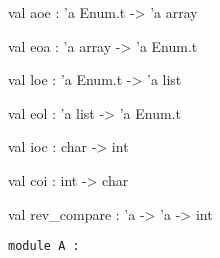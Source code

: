 \documentclass[11pt]{article}
\begin{document}
\label{val:Util.aoe}\begin{ocamldoccode}
val aoe : 'a Enum.t -> 'a array
\end{ocamldoccode}




\label{val:Util.eoa}\begin{ocamldoccode}
val eoa : 'a array -> 'a Enum.t
\end{ocamldoccode}




\label{val:Util.loe}\begin{ocamldoccode}
val loe : 'a Enum.t -> 'a list
\end{ocamldoccode}




\label{val:Util.eol}\begin{ocamldoccode}
val eol : 'a list -> 'a Enum.t
\end{ocamldoccode}




\label{val:Util.ioc}\begin{ocamldoccode}
val ioc : char -> int
\end{ocamldoccode}




\label{val:Util.coi}\begin{ocamldoccode}
val coi : int -> char
\end{ocamldoccode}




\label{val:Util.rev-underscorecompare}\begin{ocamldoccode}
val rev_compare : 'a -> 'a -> int
\end{ocamldoccode}




\begin{ocamldoccode}
{\tt{module }}{\tt{A}}{\tt{ : }}\end{ocamldoccode}
\label{module:Util.A}
\end{document}
